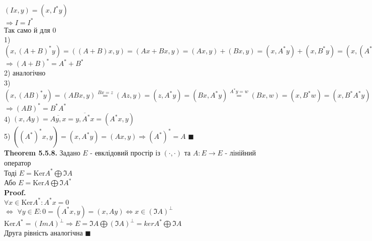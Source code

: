 \documentclass[a4paper, 14pt]{extarticle}
\def\th#1{\textbf{Theorem {#1}}}
\def\proof{\textbf{Proof.}\\}
\def\bigline{\vspace{5mm}\\}
\def\qed{$\blacksquare$}
\def\ker#1{\textrm{Ker} {#1}}
\begin{document}
$(Ix,y) = (x,I^*y)$\\
$\Rightarrow I = I^*$\\
Так само й для $0$
\bigline
1) $(x,(A+B)^*y)=((A+B)x,y) = (Ax+Bx,y) = (Ax,y) + (Bx, y) = (x,A^* y)+(x,B^* y) = (x,(A^*+B^*)y)$\\
$\Rightarrow (A+B)^* = A^* + B^*$\\
2) аналогічно
\bigline
3) $(x,(AB)^*y)=(ABx, y) \overset{Bx = z}{=} (Az,y) = (z, A^*y) = (Bx, A^*y) \overset{A^* y = w}{=} (Bx,w) = (x, B^* w) = (x, B^* A^* y)$\\
$\Rightarrow (AB)^* = B^* A^*$
\bigline
4) $(x,Ay) = \overline{Ay, x} = \overline{y, A^*x} = (A^*x, y)$
\bigline
5) $((A^*)^*x,y)=(x,A^*y) = (Ax,y) \Rightarrow (A^*)^* = A$ \qed
\bigline
\th{5.5.8.} Задано $E$ - евклідовий простір із $(\cdot, \cdot)$ та $A: E \to E$ - лінійний оператор\\
Тоді $E = \ker A^* \bigoplus \Im A$\\
Або $E = \ker A \bigoplus \Im A^*$\\
\proof
$\forall x \in \ker A^*: A^* x = 0$\\
$\iff$ $\forall y \in E: 0 = (A^*x,y) = (x, Ay) \iff x \in (\Im A)^{\perp}$\\
$\ker A^* = (Im A)^{\perp} \Rightarrow E = \Im A \bigoplus (\Im A)^{\perp} = ker A^* \bigoplus \Im A$\\
Друга рівність аналогічна \qed
\bigline
\end{document}

